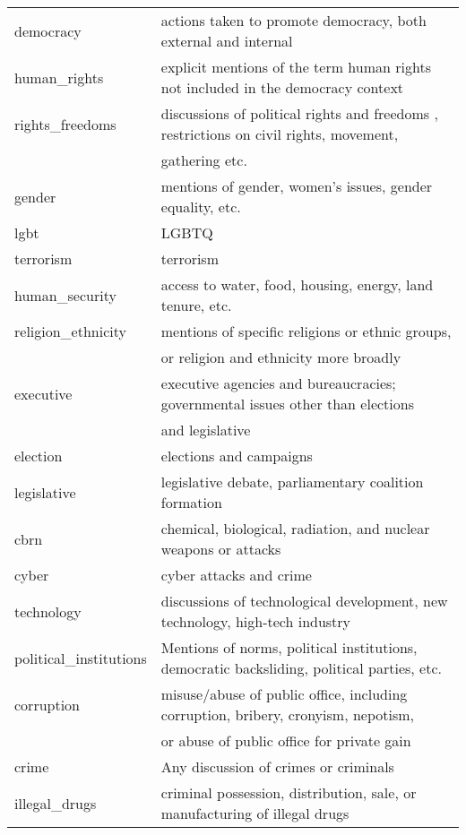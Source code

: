\documentclass[11pt]{report}
\begin{document}
\begin{table}[htp]
\begin{center}
\begin{tabular}{|p{}|L{.73\textwidth}|}
democracy & actions taken to promote democracy,  both external and internal \\
human\_rights & explicit mentions of the term human rights not included in the democracy context\\ 
rights\_freedoms & discussions of political rights and freedoms , restrictions on civil rights, movement, \\
&\hspace{6pt} gathering etc.\\
gender & mentions of gender, women's issues, gender equality, etc. \\
lgbt & LGBTQ \\
terrorism & terrorism \\
human\_security & access to water, food, housing, energy, land tenure, etc. \\
religion\_ethnicity & mentions of specific religions or ethnic groups,  \\&\hspace{6pt} or religion and ethnicity more broadly \\
executive & executive agencies and bureaucracies; governmental issues other than elections \\
&\hspace{6pt} and legislative \\
election & elections and campaigns \\
legislative & legislative debate, parliamentary coalition formation \\
cbrn & chemical, biological, radiation, and nuclear weapons or attacks  \\
cyber & cyber attacks and crime\\
technology & discussions of technological development, new technology, high-tech industry\\
political\_institutions & Mentions of norms, political institutions, democratic backsliding, political parties, etc. \\
corruption &  misuse/abuse of public office, including corruption, bribery, cronyism, nepotism,\\&\hspace{6pt} or abuse of public office for private gain  \\
crime & Any discussion of crimes or criminals \\
illegal\_drugs & criminal possession, distribution, sale, or manufacturing of illegal drugs \\
\hline
\end{tabular}
\end{center}
\label{tab:context}
\end{table}
\end{document}
